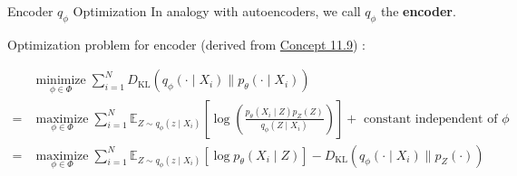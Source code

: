 \begin{frame}[allowframebreaks]

\begin{myconceptblock}{11.11}{Encoder $q_{\phi}$ Optimization}
    In analogy with autoencoders, we call $q_{\phi}$ the \textbf{encoder}.

    Optimization problem for encoder (derived from \hyperref[concept:11.9]{Concept 11.9}) :

    $$
    \begin{aligned}
    & \underset{\phi \in \Phi}{\operatorname{minimize}} \sum_{i=1}^{N} D_{\mathrm{KL}}\left(q_{\phi}\left(\cdot \mid X_{i}\right) \| p_{\theta}\left(\cdot \mid X_{i}\right)\right) \\
    = & \underset{\phi \in \Phi}{\operatorname{maximize}} \sum_{i=1}^{N} \mathbb{E}_{Z \sim q_{\phi}\left(z \mid X_{i}\right)}\left[\log \left(\frac{p_{\theta}\left(X_{i} \mid Z\right) p_{Z}(Z)}{q_{\phi}\left(Z \mid X_{i}\right)}\right)\right]+\text { constant independent of } \phi \\
    = & \underset{\phi \in \Phi}{\operatorname{maximize}} \sum_{i=1}^{N} \mathbb{E}_{Z \sim q_{\phi}\left(z \mid X_{i}\right)}\left[\log p_{\theta}\left(X_{i} \mid Z\right)\right]-D_{\mathrm{KL}}\left(q_{\phi}\left(\cdot \mid X_{i}\right) \| p_{Z}(\cdot)\right)
    \end{aligned}
    $$
\end{myconceptblock}

\end{frame}


